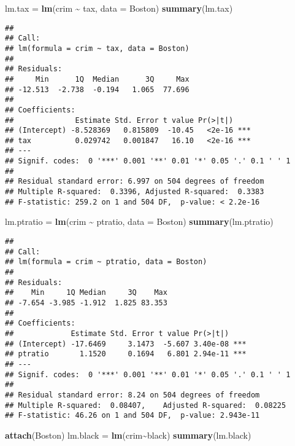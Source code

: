 \documentclass[
]{article}
\newenvironment{Shaded}{\begin{snugshade}}{\end{snugshade}}
\newcommand{\AttributeTok}[1]{\textcolor[rgb]{0.13,0.29,0.53}{#1}}
\newcommand{\FunctionTok}[1]{\textcolor[rgb]{0.13,0.29,0.53}{\textbf{#1}}}
\newcommand{\NormalTok}[1]{#1}
\newcommand{\OtherTok}[1]{\textcolor[rgb]{0.56,0.35,0.01}{#1}}
\newcommand{\SpecialCharTok}[1]{\textcolor[rgb]{0.81,0.36,0.00}{\textbf{#1}}}
\begin{document}
\begin{Shaded}
\begin{Highlighting}[]
\NormalTok{lm.tax }\OtherTok{=} \FunctionTok{lm}\NormalTok{(crim }\SpecialCharTok{\textasciitilde{}}\NormalTok{ tax, }\AttributeTok{data =}\NormalTok{ Boston)}
\FunctionTok{summary}\NormalTok{(lm.tax)}
\end{Highlighting}
\end{Shaded}

\begin{verbatim}
## 
## Call:
## lm(formula = crim ~ tax, data = Boston)
## 
## Residuals:
##     Min      1Q  Median      3Q     Max 
## -12.513  -2.738  -0.194   1.065  77.696 
## 
## Coefficients:
##              Estimate Std. Error t value Pr(>|t|)    
## (Intercept) -8.528369   0.815809  -10.45   <2e-16 ***
## tax          0.029742   0.001847   16.10   <2e-16 ***
## ---
## Signif. codes:  0 '***' 0.001 '**' 0.01 '*' 0.05 '.' 0.1 ' ' 1
## 
## Residual standard error: 6.997 on 504 degrees of freedom
## Multiple R-squared:  0.3396, Adjusted R-squared:  0.3383 
## F-statistic: 259.2 on 1 and 504 DF,  p-value: < 2.2e-16
\end{verbatim}

\begin{Shaded}
\begin{Highlighting}[]
\NormalTok{lm.ptratio }\OtherTok{=} \FunctionTok{lm}\NormalTok{(crim }\SpecialCharTok{\textasciitilde{}}\NormalTok{ ptratio, }\AttributeTok{data =}\NormalTok{ Boston)}
\FunctionTok{summary}\NormalTok{(lm.ptratio)}
\end{Highlighting}
\end{Shaded}

\begin{verbatim}
## 
## Call:
## lm(formula = crim ~ ptratio, data = Boston)
## 
## Residuals:
##    Min     1Q Median     3Q    Max 
## -7.654 -3.985 -1.912  1.825 83.353 
## 
## Coefficients:
##             Estimate Std. Error t value Pr(>|t|)    
## (Intercept) -17.6469     3.1473  -5.607 3.40e-08 ***
## ptratio       1.1520     0.1694   6.801 2.94e-11 ***
## ---
## Signif. codes:  0 '***' 0.001 '**' 0.01 '*' 0.05 '.' 0.1 ' ' 1
## 
## Residual standard error: 8.24 on 504 degrees of freedom
## Multiple R-squared:  0.08407,    Adjusted R-squared:  0.08225 
## F-statistic: 46.26 on 1 and 504 DF,  p-value: 2.943e-11
\end{verbatim}

\begin{Shaded}
\begin{Highlighting}[]
\FunctionTok{attach}\NormalTok{(Boston)}
\NormalTok{lm.black }\OtherTok{=} \FunctionTok{lm}\NormalTok{(crim}\SpecialCharTok{\textasciitilde{}}\NormalTok{black)}
\FunctionTok{summary}\NormalTok{(lm.black)}
\end{Highlighting}
\end{Shaded}
\end{document}
